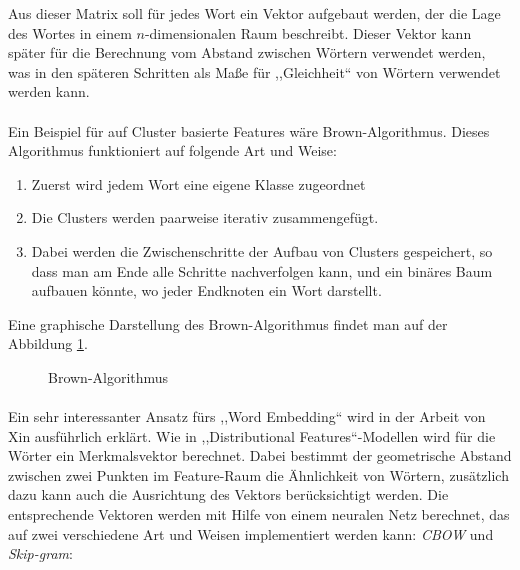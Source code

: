 Aus dieser Matrix soll für jedes Wort ein Vektor aufgebaut werden, der die Lage des Wortes in einem $n$-dimensionalen Raum beschreibt. Dieser Vektor kann später für die Berechnung vom Abstand zwischen Wörtern verwendet werden, was in den späteren Schritten als Maße für ,,Gleichheit`` von Wörtern verwendet werden kann.

\paragraph{}
Ein Beispiel für auf Cluster basierte Features wäre Brown-Algorithmus\cite{sun2011semi}. Dieses Algorithmus funktioniert auf folgende Art und Weise:
\begin{enumerate}
\item Zuerst wird jedem Wort eine eigene Klasse zugeordnet
\item Die Clusters werden paarweise iterativ zusammengefügt.
\item Dabei werden die Zwischenschritte der Aufbau von Clusters gespeichert, so dass man am Ende alle Schritte nachverfolgen kann, und ein binäres Baum aufbauen könnte, wo jeder Endknoten ein Wort darstellt.
\end{enumerate}

Eine graphische Darstellung des Brown-Algorithmus findet man auf der Abbildung \ref{fig:BROWN-CLUSTER}.

\begin{figure}[ht]
\vbox{\small}
\caption{Brown-Algorithmus}
\label{fig:BROWN-CLUSTER}
\end{figure}

\paragraph{}
Ein sehr interessanter Ansatz fürs ,,Word Embedding`` wird in der Arbeit von Xin\cite{rong2014word2vec} ausführlich erklärt. Wie in ,,Distributional Features``-Modellen wird für die Wörter ein Merkmalsvektor berechnet. Dabei bestimmt der geometrische Abstand zwischen zwei Punkten im Feature-Raum die Ähnlichkeit von Wörtern, zusätzlich dazu kann auch die Ausrichtung des Vektors berücksichtigt werden. Die entsprechende Vektoren werden mit Hilfe von einem neuralen Netz berechnet, das auf zwei verschiedene Art und Weisen implementiert werden kann: \textit{CBOW} und \textit{Skip-gram}\cite{wang2014introduction}:

